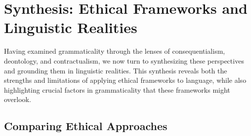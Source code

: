 \section{Synthesis: Ethical Frameworks and Linguistic Realities}

Having examined grammaticality through the lenses of consequentialism, deontology, and contractualism, we now turn to synthesizing these perspectives and grounding them in linguistic realities. This synthesis reveals both the strengths and limitations of applying ethical frameworks to language, while also highlighting crucial factors in grammaticality that these frameworks might overlook.

\subsection{Comparing Ethical Approaches}

